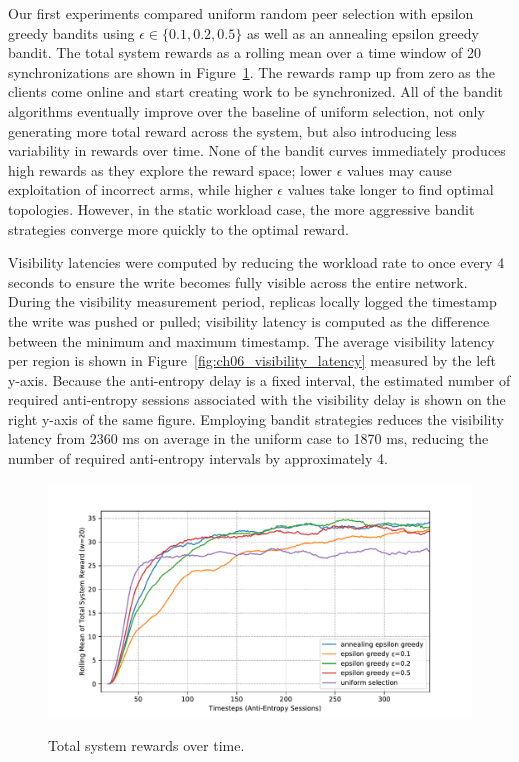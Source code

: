 Our first experiments compared uniform random peer selection with epsilon
greedy bandits using $\epsilon \in \{0.1, 0.2, 0.5\}$ as well as an annealing
epsilon greedy bandit.
The total system rewards as a rolling mean over a time window of 20
synchronizations are shown in Figure~\ref{fig:ch06_rewards}.
The rewards ramp up from zero as the clients come online and start
creating work to be synchronized.
All of the bandit algorithms eventually improve over the baseline of uniform
selection, not only generating more total reward across the system, but also
introducing less variability in rewards over time.
None of the bandit curves immediately produces high rewards as they explore
the reward space; lower $\epsilon$ values may cause exploitation of incorrect
arms, while higher $\epsilon$ values take longer to find optimal topologies.
However, in the static workload case, the more aggressive bandit strategies
converge more quickly to the optimal reward.

Visibility latencies were computed by reducing the workload rate to once
every 4 seconds to ensure the write becomes fully visible across the entire
network.
During the visibility measurement period, replicas locally logged the
timestamp the write was pushed or pulled; visibility latency is computed as
the difference between the minimum and maximum timestamp.
The average visibility latency per region is shown in
Figure~\ref{fig:ch06_visibility_latency} measured by the left y-axis.
Because the anti-entropy delay is a fixed interval, the estimated number of
required anti-entropy sessions associated with the visibility delay is shown
on the right y-axis of the same figure.
Employing bandit strategies reduces the visibility latency from 2360 ms on
average in the uniform case to 1870 ms, reducing the number of required
anti-entropy intervals by approximately 4.

\begin{figure}
    \begin{center}
        \includegraphics[width=5in]{figures/ch06_rewards.pdf}
    \end{center}
    \renewcommand{\baselinestretch}{1}
    \small\normalsize

    \begin{quote}
        \caption[Bandit Rewards]{Total system rewards over time.}
        \label{fig:ch06_rewards}
    \end{quote}
\end{figure}
\renewcommand{\baselinestretch}{2}
\small\normalsize

